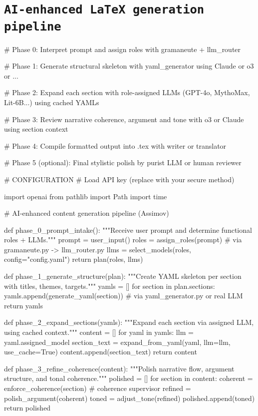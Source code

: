 \documentclass[12pt,a4paper]{article}
\begin{document}
			
			
			\section*{\texttt{AI-enhanced LaTeX generation pipeline}}
			
			\begin{metaoutput}
# Phase 0: Interpret prompt and assign roles with gramaneute + llm_router

# Phase 1: Generate structural skeleton with yaml_generator using Claude or o3 or ...

# Phase 2: Expand each section with role-assigned LLMs (GPT-4o, MythoMax, Lit-6B...) using cached YAMLs

# Phase 3: Review narrative coherence, argument and tone with o3 or Claude using section context

# Phase 4: Compile formatted output into .tex with writer or translator

# Phase 5 (optional): Final stylistic polish by purist LLM or human reviewer

# CONFIGURATION
# Load API key (replace with your secure method)

import openai
from pathlib import Path
import time

				
# AI-enhanced content generation pipeline (Assimov)

def phase_0_prompt_intake():
    """Receive user prompt and determine functional roles + LLMs."""
    prompt = user_input()
    roles = assign_roles(prompt)  # via gramaneute.py -> llm_router.py
    llms = select_models(roles, config="config.yaml")
    return plan(roles, llms)

def phase_1_generate_structure(plan):
    """Create YAML skeleton per section with titles, themes, targets."""
    yamls = []
    for section in plan.sections:
    yamls.append(generate_yaml(section))  # via yaml_generator.py or real LLM
    return yamls

def phase_2_expand_sections(yamls):
    """Expand each section via assigned LLM, using cached context."""
    content = []
    for yaml in yamls:
        llm = yaml.assigned_model
        section_text = expand_from_yaml(yaml, llm=llm, use_cache=True)
        content.append(section_text)
    return content

def phase_3_refine_coherence(content):
    """Polish narrative flow, argument structure, and tonal coherence."""
    polished = []
    for section in content:
        coherent = enforce_coherence(section)  # coherence supervisor
        refined = polish_argument(coherent)
        toned = adjust_tone(refined)
        polished.append(toned)
    return polished


\end{metaoutput}
\end{document}
